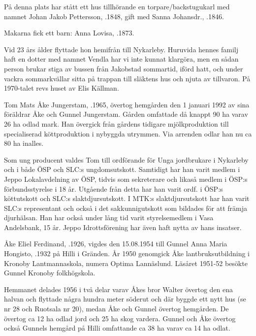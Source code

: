 
På denna plats har stått ett hus tillhörande en torpare/backstugukarl  med namnet Johan Jakob Pettersson, .1848, gift med Sanna Johansdr., .1846.

Makarna fick ett barn: Anna Lovisa, .1873.

Vid 23 års ålder flyttade hon hemifrån till Nykarleby. Huruvida hennes familj haft en dotter med namnet Vendla har vi inte kunnat klargöra, men en sådan person brukar stiga av bussen från Jakobstad sommartid, iförd hatt, och under vackra sommarkvällar sitta på trappan till släktens hus och njuta av tillvaron. På 1970-talet revs huset av Elis Källman.




Tom Mats Åke Jungerstam, .1965, övertog hemgården den 1 januari 1992 av sina föräldrar Åke och Gunnel Jungerstam. Gården omfattade då knappt 90 ha varav 26 ha odlad mark. Han övergick från gårdens tidigare mjölkproduktion till specialiserad köttproduktion i nybyggda utrymmen. Via arrenden odlar han nu ca 80 ha inalles.

Som ung producent valdes Tom till ordförande för Unga jordbrukare i Nykarleby och i både ÖSP och SLC:s  ungdomsutskott. Samtidigt har han varit medlem i Jeppo Lokalavdelning av ÖSP, tidvis som sekreterare och likaså medlem i ÖSP:s förbundsstyrelse i 18 år. Utgående från detta har han varit ordf. i ÖSP:s köttutskott och SLC:s slaktdjursutskott. I MTK:s slaktdjursutskott har han varit SLC:s representant och också i det sakkunnigutskott som bildades för att främja djurhälsan. Han har också under lång tid varit styrelsemedlem i Vasa Andelsbank, 15 år. Jeppo Idrottsförening har även haft nytta av hans insatser.


Åke Eliel Ferdinand, .1926, vigdes den 15.08.1954 till Gunnel Anna Maria Hongisto, .1932 på Hilli i Gränden. År 1950 genomgick Åke lantbruksutbildning i Kronoby Lantmannaskola, numera Optima Lannäslund. Läsåret 1951-52 besökte Gunnel Kronoby folkhögskola.

Hemmanet delades 1956 i två delar varav Åkes bror Walter övertog den ena halvan och flyttade några hundra meter söderut och där byggde ett nytt hus (se nr 28 och Ruotsala nr 20), medan Åke och Gunnel övertog hemgården. De övertog ca 12 ha odlad jord och 25 ha skog vardera. Gunnel och Åke övertog också Gunnels hemgård på Hilli omfattande ca 38 ha varav ca 14 ha odlat.

